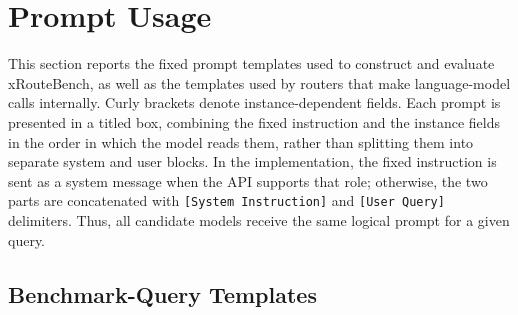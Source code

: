 \begin{table}[h]
\centering
\caption{\textbf{The five multi-agent topologies, their structures, and the number of LLM calls per query.}}
\label{tab:app-mas}
{}
\end{table}

\section{Prompt Usage} \label{app:prompt}

This section reports the fixed prompt templates used to construct and
evaluate xRouteBench, as well as the templates used by routers that make
language-model calls internally. Curly brackets denote instance-dependent
fields. Each prompt is presented in a titled box, combining the fixed
instruction and the instance fields in the order in which the model reads
them, rather than splitting them into separate system and user blocks. In the
implementation, the fixed instruction is sent as a system message when the
API supports that role; otherwise, the two parts are concatenated with
\texttt{[System Instruction]} and \texttt{[User Query]} delimiters. Thus, all
candidate models receive the same logical prompt for a given query.

\newcommand{\prompttext}[1]{{\ttfamily\noindent\detokenize{#1}\par}}
\newcommand{\promptfield}[1]{{\ttfamily\detokenize{{#1}}}}

\subsection{Benchmark-Query Templates}

